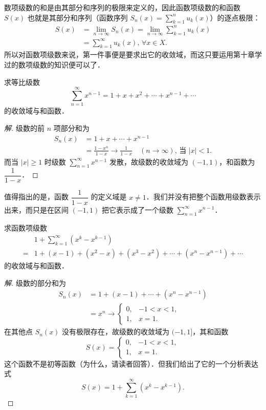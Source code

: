 数项级数的和是由其部分和序列的极限来定义的，因此函数项级数的和函数 $S(x)$ 也就是其部分和序列（函数序列 $S_{n}(x)=\displaystyle\sum_{k=1}^{n}u_{k}(x)$）的逐点极限：
\[
\begin{aligned}
S(x)&=\lim_{n\to\infty}S_{n}(x)=\lim_{n\to\infty}\sum_{k=1}^{n}u_{k}(x)\\
&=\sum_{k=1}^{\infty}u_{k}(x),\,\forall x\in X.
\end{aligned}
\]
所以对函数项级数来说，第一件事便是要求出它的收敛域，而这只要运用第十章学过的数项级数的知识便可以了．

\begin{example}\label{ex:12-2-1}
求等比级数
\[
\sum_{n=1}^{\infty}x^{n-1}=1+x+x^{2}+\cdots+x^{n-1}+\cdots
\]
的收敛域与和函数．
\end{example}

\begin{proof}[解]
级数的前 $n$ 项部分和为
\[
\begin{aligned}
S_{n}(x)&=1+x+\cdots+x^{n-1}\\
&=\frac{1-x^{n}}{1-x}\to\frac{1}{1-x}\quad(n\to\infty),\,\text{当 }|x|<1.
\end{aligned}
\]
而当 $|x|\geqslant 1$ 时级数 $\displaystyle\sum_{n=1}^{\infty}x^{n-1}$ 发散，故级数的收敛域为 $(-1,1)$，和函数为 $\dfrac{1}{1-x}$．
\end{proof}

值得指出的是，函数 $\dfrac{1}{1-x}$ 的定义域是 $x\neq 1$．我们并没有把整个函数用级数表示出来，而只是在区间 $(-1,1)$ 把它表示成了一个级数 $\displaystyle\sum_{n=1}^{\infty}x^{n-1}$．

\begin{example}\label{ex:12-2-2}
求函数项级数
\[
\begin{aligned}
&1+\sum_{k=1}^{\infty}\left(x^{k}-x^{k-1}\right)\\
={}&1+(x-1)+\left(x^{2}-x\right)+\left(x^{3}-x^{2}\right)+\cdots+\left(x^{n}-x^{n-1}\right)+\cdots
\end{aligned}
\]
的收敛域与和函数．
\end{example}

\begin{proof}[解]
级数的部分和为
\[
\begin{aligned}
S_{n}(x)&=1+(x-1)+\cdots+\left(x^{n}-x^{n-1}\right)\\
&=x^{n}\to\begin{cases}
0, & -1<x<1,\\
1, & x=1.
\end{cases}
\end{aligned}
\]
在其他点 $S_{n}(x)$ 没有极限存在，故级数的收敛域为 $(-1,1]$，其和函数
\[
S(x)=\begin{cases}
0, & -1<x<1,\\
1, & x=1.
\end{cases}
\]
这个函数不是初等函数（为什么，请读者回答）．但我们给出了它的一个分析表达式
\[
S(x)=1+\sum_{k=1}^{\infty}\left(x^{k}-x^{k-1}\right).
\]
\end{proof}

